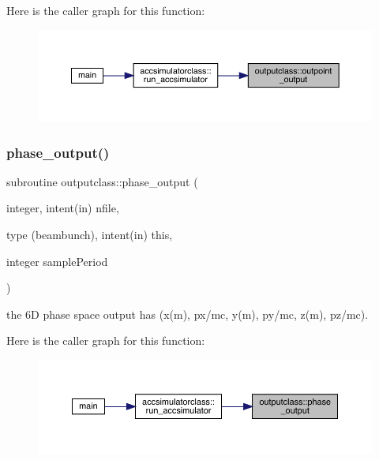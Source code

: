 Here is the caller graph for this function\+:\nopagebreak
\begin{figure}[H]
\begin{center}
\leavevmode
\includegraphics[width=350pt]{namespaceoutputclass_a14e60e5c44149548fa7843b51c625969_icgraph}
\end{center}
\end{figure}
\mbox{\label{namespaceoutputclass_a86742b646a584647da7837ee6fc09c89}} 
\subsubsection{\texorpdfstring{phase\_output()}{phase\_output()}}
{\footnotesize\ttfamily subroutine outputclass\+::phase\+\_\+output (\begin{DoxyParamCaption}\item[{integer, intent(in)}]{nfile,  }\item[{type (beambunch), intent(in)}]{this,  }\item[{integer}]{sample\+Period }\end{DoxyParamCaption})}



the 6D phase space output has (x(m), px/mc, y(m), py/mc, z(m), pz/mc). 

Here is the caller graph for this function\+:\nopagebreak
\begin{figure}[H]
\begin{center}
\leavevmode
\includegraphics[width=350pt]{namespaceoutputclass_a86742b646a584647da7837ee6fc09c89_icgraph}
\end{center}
\end{figure}
\mbox{\label{namespaceoutputclass_aaba51e45761070d95883093a25e402c4}} 
